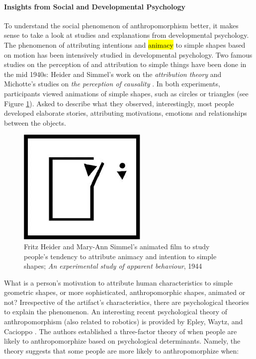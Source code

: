 \documentclass{frontiersSCNS} %
\begin{document}
\paragraph{Insights from Social and Developmental Psychology}
\label{sec:psychological-factors}

To understand the social phenomenon of anthropomorphism better, it makes sense
to take a look at studies and explanations from developmental psychology. The
phenomenon of attributing intentions and \hl{animacy} to simple shapes based on
motion has been intensively studied in developmental psychology. Two famous
studies on the perception of and attribution to simple things have been done in
the mid 1940s: Heider and Simmel's work on the \textit{attribution theory}
\cite{heider_experimental_1944} and Michotte's studies on \textit{the perception
of causality} \cite{michotte_perception_1963}. In both experiments, participants
viewed animations of simple shapes, such as circles or triangles (see Figure
\ref{fig:animacy_attribution}). Asked to describe what they observed,
interestingly, most people developed elaborate stories, attributing motivations,
emotions and relationships between the objects.

\begin{figure}\centering
  \includegraphics[scale=0.6]{heider-simmel_animation.jpeg}
 \caption{Fritz Heider and Mary-Ann Simmel's animated film to study people's tendency to attribute animacy and intention to simple shapes; \textit{An experimental study of apparent behaviour}, 1944}
 \label{fig:animacy_attribution}       %
 \end{figure}

What is a person's motivation to attribute human characteristics to simple
geometric shapes, or more sophisticated, anthropomorphic shapes, animated or
not? Irrespective of the artifact's characteristics, there are psychological
theories to explain the phenomenon. An interesting recent psychological theory
of anthropomorphism (also related to robotics) is provided by Epley, Waytz, and
Cacioppo \cite{epley_seeing_2007}. The authors established a three-factor theory
of when people are likely to anthropomorphize based on psychological
determinants. Namely, the theory suggests that some people are more likely to
anthropomorphize when:
\end{document}
